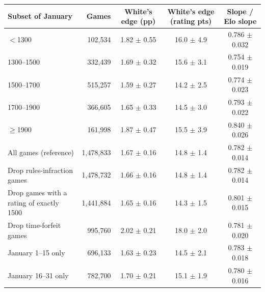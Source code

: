 \begin{tabular}{lrccc}
\toprule
Subset of January & Games & White's edge (pp) & White's edge (rating pts) & Slope / Elo slope \\
\midrule
$<$1300 & 102,534 & 1.82 $\pm$ 0.55 & 16.0 $\pm$ 4.9 & 0.786 $\pm$ 0.032 \\
1300--1500 & 332,439 & 1.69 $\pm$ 0.32 & 15.6 $\pm$ 3.1 & 0.754 $\pm$ 0.019 \\
1500--1700 & 515,257 & 1.59 $\pm$ 0.27 & 14.2 $\pm$ 2.5 & 0.774 $\pm$ 0.023 \\
1700--1900 & 366,605 & 1.65 $\pm$ 0.33 & 14.5 $\pm$ 3.0 & 0.793 $\pm$ 0.022 \\
$\ge$1900 & 161,998 & 1.87 $\pm$ 0.47 & 15.5 $\pm$ 3.9 & 0.840 $\pm$ 0.026 \\
\midrule
All games (reference) & 1,478,833 & 1.67 $\pm$ 0.16 & 14.8 $\pm$ 1.4 & 0.782 $\pm$ 0.014 \\
Drop rules-infraction games & 1,478,732 & 1.66 $\pm$ 0.16 & 14.8 $\pm$ 1.4 & 0.782 $\pm$ 0.014 \\
Drop games with a rating of exactly 1500 & 1,441,884 & 1.65 $\pm$ 0.16 & 14.3 $\pm$ 1.5 & 0.801 $\pm$ 0.015 \\
Drop time-forfeit games & 995,760 & 2.02 $\pm$ 0.21 & 18.0 $\pm$ 2.0 & 0.781 $\pm$ 0.020 \\
January 1--15 only & 696,133 & 1.63 $\pm$ 0.23 & 14.5 $\pm$ 2.1 & 0.783 $\pm$ 0.018 \\
January 16--31 only & 782,700 & 1.70 $\pm$ 0.21 & 15.1 $\pm$ 1.9 & 0.780 $\pm$ 0.016 \\
\bottomrule
\end{tabular}
